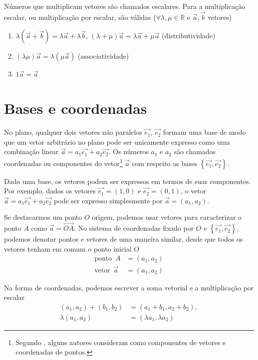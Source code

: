 \documentclass[12pt, oneside, a4paper, english, brazil]{abntex2}
\providecommand{\p}[1]{\left( #1 \right)}
\providecommand{\chaves}[1]{\left\{ #1 \right\}}
\renewcommand{\vec}{\overrightarrow}
\theoremstyle{normal}
\theoremstyle{observacao}
\begin{document}
Números que multiplicam vetores são chamados escalares. Para a multiplicação escalar, ou multiplicação por escalar, são válidas ($\forall \lambda, \mu \in \mathbb{R}$ e $\vec{a}, \vec{b}$ vetores)

\begin{enumerate}
\item $\lambda(\vec{a}+\vec{b}) = \lambda\vec{a}+\lambda\vec{b}$, $(\lambda+\mu)\vec{a}= \lambda\vec{a}+\mu\vec{a}$ (distributividade)
\item $(\lambda\mu)\vec{a}=\lambda(\mu\vec{a})$ (associatividade)
\item $1\vec{a} = \vec{a}$
\end{enumerate}

\section{Bases e coordenadas}

No plano, qualquer dois vetores não paralelos $\vec{e_1}$, $\vec{e_2}$ formam uma base de modo que um vetor arbitrário no plano pode ser unicamente expresso como uma combinação linear $\vec{a}= a_1\vec{e_1}+a_2\vec{e_2}$. Os números $a_1$ e $a_2$ são chamados coordenadas ou componentes do vetor\footnote{Segundo , alguns autores consideram como componentes de vetores e coordenadas de pontos.} $\vec{a}$ com respeito as bases $\chaves{\vec{e_1}, \vec{e_2}}$.

Dado uma base, os vetores podem ser expressos em termos de suas componentes. Por exemplo, dados os vetores $\vec{e_1}= \p{1,0}$ e $\vec{e_2}=\p{0,1}$, o vetor $\vec{a}= a_1\vec{e_1}+a_2\vec{e_2}$ pode ser expresso simplesmente por $\vec{a}=\p{a_1,a_2}$.

Se destacarmos um ponto $O$ origem, podemos usar vetores para caracterizar o ponto $A$ como $\vec{a}=\vec{OA}$. No sistema de coordenadas fixado por $O$ e $\chaves{\vec{e_1}, \vec{e_2}}$, podemos denotar pontos e vetores de uma maneira similar, desde que todos os vetores tenham em comum o ponto inicial $O$
\begin{align*}
\text{ponto }\, A &= \p{a_1,a_2}\\
\text{vetor }\, \vec{a} &= \p{a_1,a_2}
\end{align*}

Na forma de coordenadas, podemos escrever a soma vetorial e a multiplicação por escalar
\begin{align*}
\p{a_1,a_2}+\p{b_1,b_2} &= \p{a_1+b_1, a_2+b_2}, \\
\lambda \p{a_1,a_2} &= \p{\lambda a_1, \lambda a_2}
\end{align*}
\end{document}
